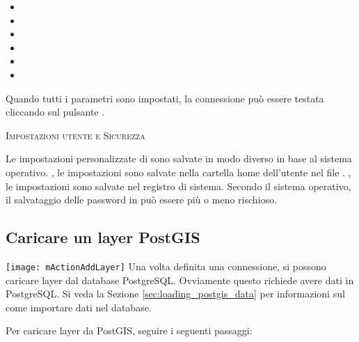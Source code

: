 \begin{itemize}[label=--]
\item {}
\item {}
\item {}
\item {}
\item {}
\item {}
\end{itemize}

Quando tutti i parametri sono impostati, la connessione può essere testata
cliccando sul pulsante  .

\begin{Tip}\caption{\textsc{Impostazioni utente e Sicurezza}}
Le impostazioni personalizzate di \qg sono salvate in modo diverso
in base al sistema operativo. \nix, le impostazioni sono salvate nella
cartella home dell'utente nel file . \win, le
impostazioni sono salvate nel registro di sistema. Secondo il sistema
operativo, il salvataggio delle password in \qg può essere più o meno rischioso.
\end{Tip}

\subsection{Caricare un layer PostGIS}

\texttt{[image: mActionAddLayer]} Una volta definita una 
connessione, si possono caricare layer dal database PostgreSQL.
Ovviamente questo richiede avere dati in PostgreSQL. Si veda la Sezione
\ref{sec:loading_postgis_data} per informazioni sul come importare dati nel
database. 

Per caricare layer da PostGIS, seguire i seguenti passaggi:

